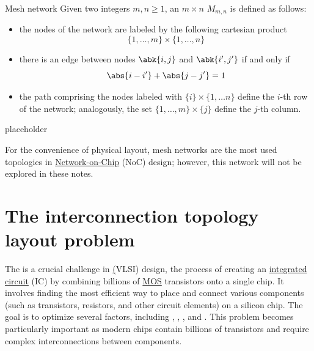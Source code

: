 \documentclass[a4paper, 12pt]{report}
\begin{document}
    \begin{frameddefn}{Mesh network}
        Given two integers $m, n \ge 1$, an $m \times n$  $M_{m, n}$ is defined as follows:

        \begin{itemize}
            \item the nodes of the network are labeled by the following cartesian product $$\{1, \ldots, m\} \times \{1, \ldots, n\}$$
            \item there is an edge between nodes $\abk{i,j}$ and $\abk{i',j'}$ if and only if $$\abs{i - i'} + \abs{j - j'} = 1$$
            \item the path comprising the nodes labeled with $\{i\} \times \{1, \ldots n\}$ define the $i$-th row of the network; analogously, the set $\{1, \ldots, m\} \times \{j\}$ define the $j$-th column.
        \end{itemize}
    \end{frameddefn}

    \begin{example}
        placeholder 
    \end{example}

    For the convenience of physical layout, mesh networks are the most used topologies in \href{https://en.wikipedia.org/wiki/Network_on_a_chip}{Network-on-Chip} (NoC) design; however, this network will not be explored in these notes.

    \chapter{The interconnection topology layout problem}
    
    The  is a crucial challenge in \href{very-large-scale integration} (VLSI) design, the process of creating an \href{https://en.wikipedia.org/wiki/Integrated_circuit}{integrated circuit} (IC) by combining billions of \href{https://en.wikipedia.org/wiki/MOSFET}{MOS} transistors onto a single chip. It involves finding the most efficient way to place and connect various components (such as transistors, resistors, and other circuit elements) on a silicon chip. The goal is to optimize several factors, including , , , and . This problem becomes particularly important as modern chips contain billions of transistors and require complex interconnections between components.
\end{document}
